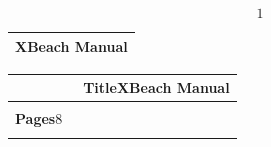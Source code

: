 \documentclass{article}
\begin{document}
\noindent 

\noindent 
\[1\] 


\noindent 

\noindent 

\noindent 

\noindent 

\noindent 

\noindent 

\noindent 

\noindent 

\noindent 

\noindent 

\noindent 

\noindent 

\noindent 

\noindent 

\noindent 

\begin{tabular}{|p{2.5in}|} \hline 
\textbf{XBeach Manual\newline \newline } \\ \hline 
\end{tabular}



\noindent 

\noindent 

\noindent 

\noindent 

\noindent 

\noindent 

\noindent 

\noindent 

\noindent 

\noindent 

\noindent 

\noindent 

\begin{tabular}{|p{1.3in}|p{0.6in}|p{0.6in}|p{1.2in}|p{0.4in}|} \hline 
\multicolumn{2}{|p{1in}|}{} & \multicolumn{3}{|p{2.2in}|}{\textbf{Title\newline }XBeach Manual} \\ \hline 
\multicolumn{3}{|p{1in}|}{} & \multicolumn{2}{|p{1.6in}|}{} \\ \hline 
\textbf{Pages\newline }8 & \multicolumn{2}{|p{1.2in}|}{} &  &  \\ \hline 
\multicolumn{5}{|p{1in}|}{} \\ \hline 
\end{tabular}
\end{document}
